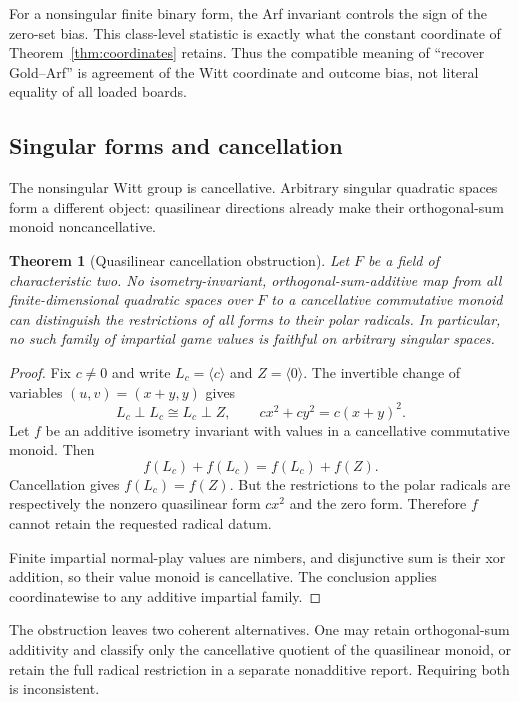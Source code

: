 \documentclass[11pt]{article}
\newtheorem{theorem}{Theorem}[section]
\theoremstyle{definition}
\theoremstyle{remark}
\begin{document}
For a nonsingular finite binary form, the Arf invariant controls the sign of
the zero-set bias.  This class-level statistic is exactly what the constant
coordinate of Theorem~\ref{thm:coordinates} retains.  Thus the compatible
meaning of ``recover Gold--Arf'' is agreement of the Witt coordinate and
outcome bias, not literal equality of all loaded boards.

\subsection{Singular forms and cancellation}

The nonsingular Witt group is cancellative.  Arbitrary singular quadratic
spaces form a different object: quasilinear directions already make their
orthogonal-sum monoid noncancellative.

\begin{theorem}[Quasilinear cancellation obstruction]\label{thm:singular}
Let $F$ be a field of characteristic two.  No isometry-invariant,
orthogonal-sum-additive map from all finite-dimensional quadratic spaces over
$F$ to a cancellative commutative monoid can distinguish the restrictions of
all forms to their polar radicals.  In particular, no such family of impartial
game values is faithful on arbitrary singular spaces.
\end{theorem}

\begin{proof}
Fix $c\ne0$ and write $L_c=\langle c\rangle$ and
$Z=\langle0\rangle$.  The invertible change of variables
$(u,v)=(x+y,y)$ gives
\[
L_c\perp L_c\cong L_c\perp Z,
\qquad
cx^2+cy^2=c(x+y)^2.
\]
Let $f$ be an additive isometry invariant with values in a cancellative
commutative monoid.  Then
\[
f(L_c)+f(L_c)=f(L_c)+f(Z).
\]
Cancellation gives $f(L_c)=f(Z)$.  But the restrictions to the polar radicals
are respectively the nonzero quasilinear form $cx^2$ and the zero form.
Therefore $f$ cannot retain the requested radical datum.

Finite impartial normal-play values are nimbers, and disjunctive sum is their
xor addition, so their value monoid is cancellative.  The conclusion applies
coordinatewise to any additive impartial family.
\end{proof}

The obstruction leaves two coherent alternatives.  One may retain
orthogonal-sum additivity and classify only the cancellative quotient of the
quasilinear monoid, or retain the full radical restriction in a separate
nonadditive report.  Requiring both is inconsistent.
\end{document}
